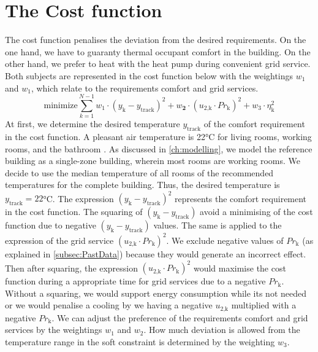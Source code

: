 \section{The Cost function}
\label{section:thecostfunction}

The cost function penalises the deviation from the desired requirements. On the one hand, we have to guaranty thermal occupant comfort in the building. On the other hand, we prefer to heat with the heat pump during convenient grid service. Both subjects are represented in the cost function below with the weightings $w_\text{1}$ and $w_\text{1}$, which relate to the requirements comfort and grid services.
    \begin{equation}
        \text{minimize} \sum_{k=1}^{N-1} w_\text{1}\cdot (y_\text{k}-y_\text{track})^2 + w_\textbf{2}\cdot(u_\text{2,k}\cdot Pr_\text{k})^2 + w_\text{3} \cdot \eta_\text{k}^2
        \label{eq:costfunctatsächlich}
    \end{equation}
At first, we determine the desired temperature $y_\text{track}$ of the comfort requirement in the cost function. A pleasant air temperature is 22°C for living rooms, working rooms, and the bathroom \cite{Umweltbundesamt.7.10.2021}. As discussed in \autoref{ch:modelling}, we model the reference building as a single-zone building, wherein most rooms are working rooms. We decide to use the median temperature of all rooms of the recommended temperatures for the complete building. Thus, the desired temperature is $y_\text{track} = 22$°C.\newline
The expression $(y_\text{k}-y_\text{track})^2$ represents the comfort requirement in the cost function. The squaring of $(y_\text{k}-y_\text{track})$ avoid a minimising of the cost function due to negative $(y_\text{k}-y_\text{track})$ values. The same is applied to the expression of the grid service $(u_\text{2,k}\cdot Pr_\text{k})^2$. We exclude negative values of $Pr_\text{k}$ (as explained in \autoref{subsec:PastData}) because they would generate an incorrect effect. Then after squaring, the expression $(u_\text{2,k}\cdot Pr_\text{k})^2$ would maximise the cost function during a appropriate time for grid services due to a negative $Pr_\text{k}$. Without a squaring, we would support energy consumption while its not needed or we would penalise a cooling by we having a negative $u_\text{2,k}$ multiplied with a negative $Pr_\text{k}$.\newline
We can adjust the preference of the requirements comfort and grid services by the weightings $w_\text{1}$ and $w_\text{2}$. How much deviation is allowed from the temperature range in the soft constraint is determined by the weighting $w_\text{3}$.\newline
